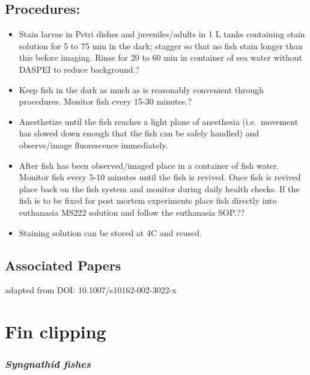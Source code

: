 \documentclass[
  letterpaper,
  DIV=11,
  numbers=noendperiod]{scrreprt}
\providecommand{\tightlist}{%
  \setlength{\itemsep}{0pt}\setlength{\parskip}{0pt}}\usepackage{longtable,booktabs,array}
\begin{document}
\hypertarget{procedures-3}{%
\section{Procedures:}\label{procedures-3}}

\begin{itemize}
\tightlist
\item
  Stain larvae in Petri dishes and juveniles/adults in 1 L tanks
  containing stain solution for 5 to 75 min in the dark; stagger so that
  no fish stain longer than this before imaging. Rinse for 20 to 60 min
  in container of sea water without DASPEI to reduce background.?
\item
  Keep fish in the dark as much as is reasonably convenient through
  procedures. Monitor fish every 15-30 minutes.?
\item
  Anesthetize until the fish reaches a light plane of anesthesia
  (i.e.~movement has slowed down enough that the fish can be safely
  handled) and observe/image fluorescence immediately.
\item
  After fish has been observed/imaged place in a container of fish
  water. Monitor fish every 5-10 minutes until the fish is revived. Once
  fish is revived place back on the fish system and monitor during daily
  health checks. If the fish is to be fixed for post mortem experiments
  place fish directly into euthanasia MS222 solution and follow the
  euthanasia SOP.??
\item
  Staining solution can be stored at 4C and reused.
\end{itemize}

\hypertarget{associated-papers-42}{%
\section{Associated Papers}\label{associated-papers-42}}

adapted from DOI: 10.1007/s10162-002-3022-x

\hypertarget{sec-vert_exp-fin_clip_syn}{%
\chapter{Fin clipping}\label{sec-vert_exp-fin_clip_syn}}

\hypertarget{syngnathid-fishes-3}{%
\subsection{\texorpdfstring{\emph{Syngnathid
fishes}}{Syngnathid fishes}}\label{syngnathid-fishes-3}}
\end{document}
